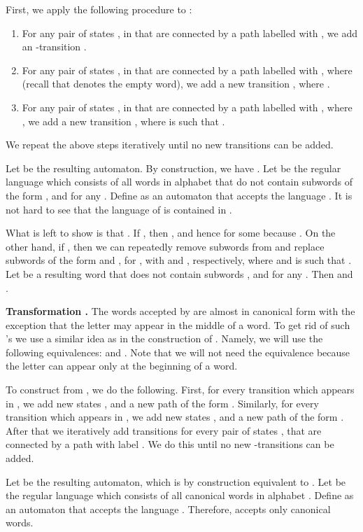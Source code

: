 \documentclass[fontsize=11pt,DIV=13,paper=letter]{scrartcl}
\theoremstyle{definition}
\begin{document}
First, we apply the following procedure to :
\begin{enumerate}[(1)]
\item For any pair of states ,  in  that are connected by a path labelled with , we add an -transition .

\item For any pair of states ,  in  that are connected by a path labelled with , where  (recall that  denotes the empty word), we add a new transition , where .

\item For any pair of states ,  in  that are connected by a path labelled with , where , we add a new transition , where  is such that .
\end{enumerate}
We repeat the above steps iteratively until no new transitions can be added.

Let  be the resulting automaton. By construction, we have . Let  be the regular language which consists of all words in alphabet  that do not contain subwords of the form ,  and  for any . Define  as an automaton that accepts the language . It is not hard to see that the language of  is contained in .

What is left to show is that . If , then , and hence  for some  because . On the other hand, if , then we can repeatedly remove subwords  from  and replace subwords of the form  and , for , with  and , respectively, where  and  is such that . Let  be a resulting word that does not contain subwords ,  and  for any . Then  and .

{\bf Transformation .} The words accepted by  are almost in canonical form with the exception that the letter  may appear in the middle of a word. To get rid of such 's we use a similar idea as in the construction of . Namely, we will use the following equivalences:  and . Note that we will not need the equivalence  because the letter  can appear only at the beginning of a word.

To construct  from , we do the following. First, for every transition  which appears in , we add new states ,  and a new path of the form . Similarly, for every transition  which appears in , we add new states ,  and a new path of the form . After that we iteratively add  transitions  for every pair of states ,  that are connected by a path with label . We do this until no new -transitions can be added. 

Let  be the resulting automaton, which is by construction equivalent to . Let  be the regular language which consists of all canonical words in alphabet . Define  as an automaton that accepts the language . Therefore,  accepts only canonical words.
\end{document}

